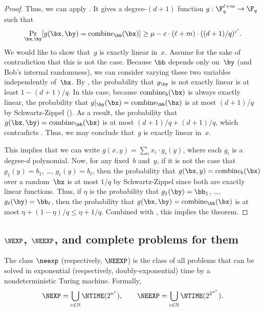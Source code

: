 \begin{proof}
Thus, we can apply . It gives a degree-$(d+1)$ function $g: \F_q^{\ell + m} \rightarrow \F_q$ such that
\begin{equation}\label{eq:g-equals-combine}
\Pr_{\bx, \by}[g(\bx, \by) = \mathrm{combine}_{\bb}(\bx)] \geq \mu - c \cdot (\ell + m)\cdot ((d+1)/q)^{c'}.
\end{equation}
We would like to show that~$g$ is exactly linear in~$x$.
Assume for the sake of contradiction that this is not the case.
Because $\bb$ depends only on~$\by$ (and Bob's internal randomness),
we can consider varying these two variables independently of~$\bx$.
By , the probability that $g_{\by}$ is not exactly linear is at least $1-(d+1)/q$.
In this case, because $\mathrm{combine}_b(\bx)$ is always exactly linear,
the probability that $g|_{\by}(\bx) = \mathrm{combine}_{\bb}(\bx)$ is at most $(d+1)/q$ by Schwartz-Zippel ().
As a result, the probability that $g(\bx, \by) = \mathrm{combine}_{\bb}(\bx)$ is at most $(d+1)/q + (d+1)/q$, which contradicts .
Thus, we may conclude that~$g$ is exactly linear in~$x$.

This implies that we can write $g(x, y) = \sum_i x_i \cdot g_i(y)$, where each $g_i$ is a degree-$d$ polynomial.
Now, for any fixed~$b$ and~$y$, if it is not the case that $g_1(y) = b_1$, \ldots, $g_\ell(y) = b_\ell$,
then the probability that $g(\bx, y) = \mathrm{combine}_{b}(\bx)$ over a random~$\bx$ is at most $1/q$ by Schwartz-Zippel since both are exactly linear functions.
Thus, if $\eta$ is the probability that $g_1(\by) = \bb_1$, \ldots, $g_\ell(\by) = \bb_\ell$,
then the probability that $g(\bx, \by) = \mathrm{combine}_{\bb}(\bx)$ is at most $\eta + (1-\eta)/q \leq \eta + 1/q$.
Combined with , this implies the theorem.
\end{proof}

\subsection{$\NEXP$, $\NEEXP$, and complete problems for them}

\begin{definition}
  \label{def:neexp}
  The class $\neexp$ (respectively, $\NEEXP$) is the class of all problems that can be solved
  in exponential (respectively, doubly-exponential) time by a nondeterministic Turing
  machine. Formally,
\begin{equation*}
\NEXP = \bigcup_{c \in \mathbb{N}}  \NTIME(2^{n^c}),\qquad
\NEEXP = \bigcup_{c \in \mathbb{N}}  \NTIME(2^{2^{n^c}}).
\end{equation*}
\end{definition}

